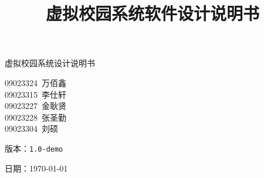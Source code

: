 \ifx\maindoc\undefined
{}
\fi
\title{虚拟校园系统软件设计说明书}



\begin{titlepage}
    \vspace*{\fill}

    \begin{center}
        {\Huge 虚拟校园系统设计说明书}

        \vspace{10cm}
        {\large
            09023324~万佰鑫 \\
            09023315~李仕轩 \\
            09023227~金耿贤 \\
            09023228~张圣勤 \\
            09023304~刘\quad 硕\\
        }

        \vspace{0.5cm}
        {\large 版本：\texttt{1.0-demo}}


        \vspace{0.5cm}


        {\large 日期：\today}
    \end{center}

    \vspace*{\fill}
\end{titlepage}
